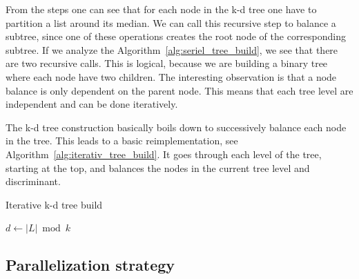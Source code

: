 From the steps one can see that for each node in the k-d tree one have to partition a list around its median. We can call this recursive step to balance a subtree, since one of these operations creates the root node of the corresponding subtree.  If we analyze the Algorithm~\ref{alg:seriel_tree_build}, we see that there are two recursive calls. This is logical, because we are building a binary tree where each node have two children. The interesting observation is that a node balance is only dependent on the parent node. This means that each tree level are independent and can be done iteratively.

The k-d tree construction basically boils down to successively balance each node in the tree. This leads to a basic reimplementation, see Algorithm~\ref{alg:iterativ_tree_build}. It goes through each level of the tree, starting at the top, and balances the nodes in the current tree level and discriminant.

\begin{algorithm}
\caption{Iterative k-d tree build}
\label{alg:iterativ_tree_build}
\begin{algorithmic}
                \State$d \gets |L| \bmod k$ 
                \State {}
            \EndFor
        \EndFor
    \EndFunction
\end{algorithmic}
\end{algorithm}





\subsection{Parallelization strategy} %
\label{ssub:parallelization_strategy}


